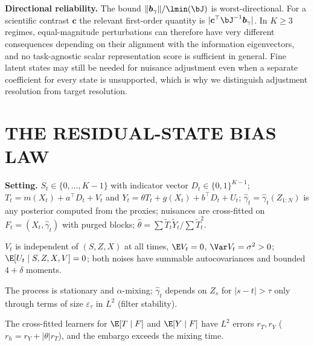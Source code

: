 \textbf{Directional reliability.} The bound $\|\boldsymbol b_\gamma\|/\lmin(\bJ)$ is worst-directional. For a scientific contrast $\boldsymbol c$ the relevant first-order quantity is $|\boldsymbol c^\top\bJ^{-1}\boldsymbol b_\gamma|$. In $K\ge3$ regimes, equal-magnitude perturbations can therefore have very different consequences depending on their alignment with the information eigenvectors, and no task-agnostic scalar representation score is sufficient in general. Fine latent states may still be needed for nuisance adjustment even when a separate coefficient for every state is unsupported, which is why we distinguish adjustment resolution from target resolution.

\section{THE RESIDUAL-STATE BIAS LAW}
\label{app:biaslaw}
\textbf{Setting.} $S_t\in\{0,\dots,K-1\}$ with indicator vector $D_t\in\{0,1\}^{K-1}$; $T_t=m(X_t)+a^\top D_t+V_t$ and $Y_t=\theta T_t+g(X_t)+b^\top D_t+U_t$; $\hat\gamma_t=\hat\gamma_t(Z_{1:N})$ is any posterior computed from the proxies; nuisances are cross-fitted on $F_t=(X_t,\hat\gamma_t)$ with purged blocks; $\hat\theta=\sum\tilde T_t\tilde Y_t/\sum\tilde T_t^2$.
\begin{assumption}\label{as:noise} $V_t$ is independent of $(S,Z,X)$ at all times, $\E V_t=0$, $\Var V_t=\sigma^2>0$; $\E[U_t\mid S,Z,X,V]=0$; both noises have summable autocovariances and bounded $4{+}\delta$ moments.\end{assumption}
\begin{assumption}\label{as:post} The process is stationary and $\alpha$-mixing; $\hat\gamma_t$ depends on $Z_s$ for $|s-t|>\tau$ only through terms of size $\varepsilon_\tau$ in $L^2$ (filter stability).\end{assumption}
\begin{assumption}\label{as:nuis} The cross-fitted learners for $\E[T\mid F]$ and $\E[Y\mid F]$ have $L^2$ errors $r_T,r_Y$ ($r_h=r_Y+|\theta|r_T$), and the embargo exceeds the mixing time.\end{assumption}

